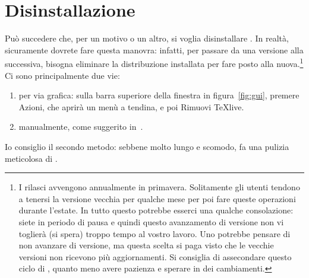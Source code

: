 
\section{Disinstallazione}

Può succedere che, per un motivo o un altro, si voglia disinstallare \texlive{}. In realtà, sicuramente dovrete fare questa manovra: infatti, per passare da una versione alla successiva, bisogna eliminare la distribuzione installata per fare posto alla nuova.\footnote{I rilasci avvengono annualmente in primavera. Solitamente gli utenti tendono a tenersi la versione vecchia per qualche mese per poi fare queste operazioni durante l'estate. In tutto questo potrebbe esserci una qualche consolazione: siete in periodo di pausa e quindi questo avanzamento di versione non vi toglierà (si spera) troppo tempo al vostro lavoro. Uno potrebbe pensare di non avanzare di versione, ma questa scelta si paga visto che le vecchie versioni non ricevono più aggiornamenti. Si consiglia di assecondare questo ciclo di , quanto meno avere pazienza e sperare in dei cambiamenti.} Ci sono principalmente due vie: 
\begin{enumerate}
\item per via grafica: sulla barra superiore della finestra in figura~\ref{fig:gui}, premere {\sf Azioni}, che aprirà un menù a tendina, e poi {\sf Rimuovi TeXlive}.
\item manualmente, come suggerito in~\cite{exch:uninstall}.
\end{enumerate}
Io consiglio il secondo metodo: sebbene molto lungo e scomodo, fa una pulizia meticolosa di \texlive{}.